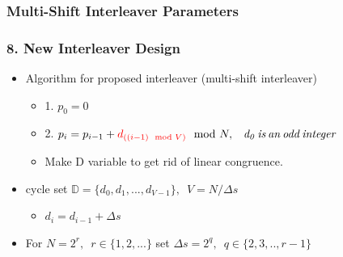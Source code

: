 \documentclass{beamer}  %
\begin{document}
\subsubsection{ Multi-Shift Interleaver Parameters}
\begin{frame}
\frametitle{8. New Interleaver Design}

\begin{itemize}
\setlength\itemsep{1.5em}

\item Algorithm for proposed interleaver (multi-shift interleaver)

\begin{itemize}
\item 1. $p_0=0$
 
 \item 2. $p_i=p_{i-1}+\textcolor{red}{d_{((i-1) \mod V) } }\mod N,\,\,\,\,\,  \mathit{d_0 \,is \,an \,odd \,integer}$

\item Make D variable to get rid of linear congruence.
\end{itemize}

\item cycle set $\mathbb{D}=\{d_0,d_1,...,d_{V-1}\},\,\,\, V=N/\Delta s$
\begin{itemize}
\item $d_i=d_{i-1}+\Delta s$
\end{itemize}

\item For $N=2^r,\,\,\, r\in \{ 1,2,...\}$ set $\Delta s= 2^q, \,\,\, q\in\{2,3,..,r-1\}$







\end{itemize}


\end{frame}
\end{document}
